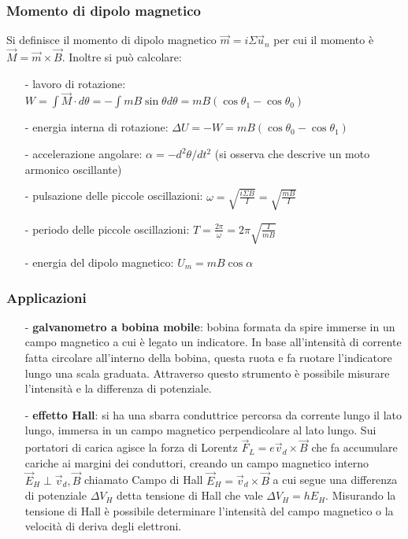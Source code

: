 \documentclass[a4paper]{article}
\newcommand\un{\vec{u}_n}
\begin{document}
\subsubsection*{Momento di dipolo magnetico}
Si definisce il momento di dipolo magnetico \(\vec{m} = i \Sigma \un\) per cui il momento è \(\vec{M} = \vec{m} \times \vec{B}\).
Inoltre si può calcolare:
\begin{itemize}[topsep=3pt, itemsep=0pt]
	\item[-] lavoro di rotazione: \(W = \int \vec{M} \cdot d\theta = - \int m B \sin \theta d\theta = mB (\cos \theta_1 - \cos \theta_0)\)
	\item[-] energia interna di rotazione: \(\Delta U = -W = mB (\cos \theta_0 - \cos \theta_1)\)
	\item[-] accelerazione angolare: \(\alpha = - d^2 \theta / dt^2\) (si osserva che descrive un moto armonico oscillante)
	\item[-] pulsazione delle piccole oscillazioni: \(\omega = \sqrt{\frac{i \Sigma B}{I}} = \sqrt{\frac{mB}{I}}\)
	\item[-] periodo delle piccole oscillazioni: \(T = \frac{2 \pi}{\omega} = 2 \pi \sqrt{\frac{I}{mB}}\)
	\item[-] energia del dipolo magnetico: \(U_m = mB\cos\alpha\)
\end{itemize} 

\subsubsection*{Applicazioni}
\begin{itemize}[topsep=3pt, itemsep=0pt]
	\item[-] \textbf{galvanometro a bobina mobile}: bobina formata da spire immerse in un campo magnetico a cui è legato un
	indicatore. In base all'intensità di corrente fatta circolare all'interno della bobina, questa ruota e fa ruotare l'indicatore
	lungo una scala graduata. Attraverso questo strumento è possibile misurare l'intensità e la differenza di potenziale.
	\item[-] \textbf{effetto Hall}: si ha una sbarra conduttrice percorsa da corrente lungo il lato lungo, immersa in un campo
	magnetico perpendicolare al lato lungo. Sui portatori di carica agisce la forza di Lorentz \(\vec{F}_L = e \vec{v}_d \times \vec{B}\)
	che fa accumulare cariche ai margini dei conduttori, creando un campo magnetico interno \(\vec{E}_H \perp \vec{v}_d, \vec{B}\)
	chiamato Campo di Hall \(\vec{E}_H = \vec{v}_d \times \vec{B}\) a cui segue una differenza di potenziale
	\(\Delta V_H\) detta tensione di Hall che vale \(\Delta V_H = h E_H\). Misurando la tensione di Hall è possibile determinare
	l'intensità del campo magnetico o la velocità di deriva degli elettroni.
\end{itemize}
\end{document}

